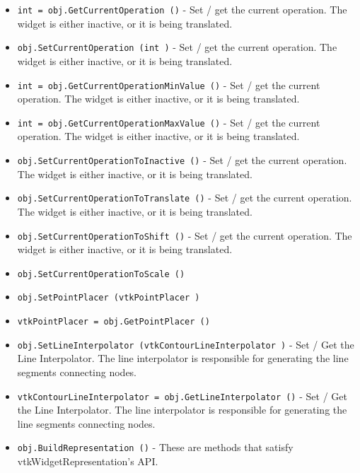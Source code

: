 \begin{itemize}
\item  \verb|int = obj.GetCurrentOperation ()| -  Set / get the current operation. The widget is either
 inactive, or it is being translated.

\item  \verb|obj.SetCurrentOperation (int )| -  Set / get the current operation. The widget is either
 inactive, or it is being translated.

\item  \verb|int = obj.GetCurrentOperationMinValue ()| -  Set / get the current operation. The widget is either
 inactive, or it is being translated.

\item  \verb|int = obj.GetCurrentOperationMaxValue ()| -  Set / get the current operation. The widget is either
 inactive, or it is being translated.

\item  \verb|obj.SetCurrentOperationToInactive ()| -  Set / get the current operation. The widget is either
 inactive, or it is being translated.

\item  \verb|obj.SetCurrentOperationToTranslate ()| -  Set / get the current operation. The widget is either
 inactive, or it is being translated.

\item  \verb|obj.SetCurrentOperationToShift ()| -  Set / get the current operation. The widget is either
 inactive, or it is being translated.

\item  \verb|obj.SetCurrentOperationToScale ()|

\item  \verb|obj.SetPointPlacer (vtkPointPlacer )|

\item  \verb|vtkPointPlacer = obj.GetPointPlacer ()|

\item  \verb|obj.SetLineInterpolator (vtkContourLineInterpolator )| -  Set / Get the Line Interpolator. The line interpolator
 is responsible for generating the line segments connecting
 nodes.

\item  \verb|vtkContourLineInterpolator = obj.GetLineInterpolator ()| -  Set / Get the Line Interpolator. The line interpolator
 is responsible for generating the line segments connecting
 nodes.

\item  \verb|obj.BuildRepresentation ()| -  These are methods that satisfy vtkWidgetRepresentation's API.


\end{itemize}
